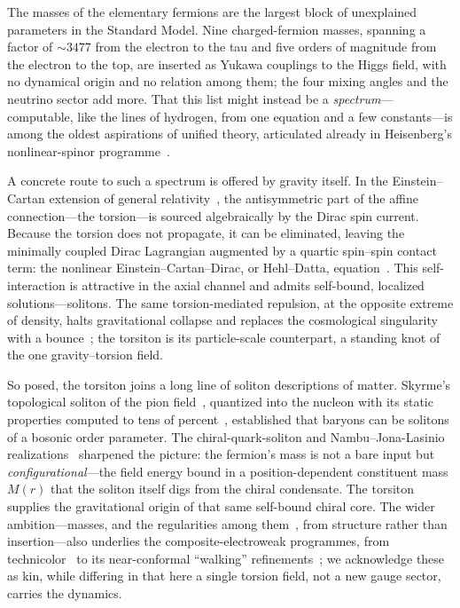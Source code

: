 \documentclass[aps,prd,reprint,nofootinbib,superscriptaddress]{revtex4-2}
\begin{document}
The masses of the elementary fermions are the largest block of unexplained parameters in the Standard
Model. Nine charged-fermion masses, spanning a factor of $\sim\!3477$ from the electron to the tau and
five orders of magnitude from the electron to the top, are inserted as Yukawa couplings to the Higgs
field, with no dynamical origin and no relation among them; the four mixing angles and the neutrino
sector add more. That this list might instead be a \emph{spectrum}---computable, like the lines of
hydrogen, from one equation and a few constants---is among the oldest aspirations of unified theory,
articulated already in Heisenberg's nonlinear-spinor programme~\citep{heisenberg1957}.

A concrete route to such a spectrum is offered by gravity itself. In the Einstein--Cartan extension of
general relativity~\citep{hehl1976}, the antisymmetric part of the affine connection---the torsion---is
sourced algebraically by the Dirac spin current. Because the torsion does not propagate, it can be
eliminated, leaving the minimally coupled Dirac Lagrangian augmented by a quartic spin--spin contact
term: the nonlinear Einstein--Cartan--Dirac, or Hehl--Datta, equation~\citep{hehldatta1971}. This
self-interaction is attractive in the axial channel and admits self-bound, localized
solutions---solitons. The same torsion-mediated repulsion, at the opposite extreme of density, halts
gravitational collapse and replaces the cosmological singularity with a bounce~\citep{poplawski2010,
poplawski2012}; the torsiton is its particle-scale counterpart, a standing knot of the one
gravity--torsion field.

So posed, the torsiton joins a long line of soliton descriptions of matter. Skyrme's topological
soliton of the pion field~\citep{skyrme1962}, quantized into the nucleon with its static properties
computed to tens of percent~\citep{adkins1983, witten1983}, established that baryons can be solitons of
a bosonic order parameter. The chiral-quark-soliton and Nambu--Jona-Lasinio
realizations~\citep{nambu1961, diakonov1988, kahanaripka1984} sharpened the picture: the fermion's mass
is not a bare input but \emph{configurational}---the field energy bound in a position-dependent
constituent mass $M(r)$ that the soliton itself digs from the chiral condensate. The torsiton supplies
the gravitational origin of that same self-bound chiral core. The wider ambition---masses, and the
regularities among them~\citep{koide1983}, from structure rather than insertion---also underlies the
composite-electroweak programmes, from technicolor~\citep{weinberg1979, susskind1979} to its
near-conformal ``walking'' refinements~\citep{holdom1981, dietrich2007}; we acknowledge these as kin,
while differing in that here a single torsion field, not a new gauge sector, carries the dynamics.
\end{document}
